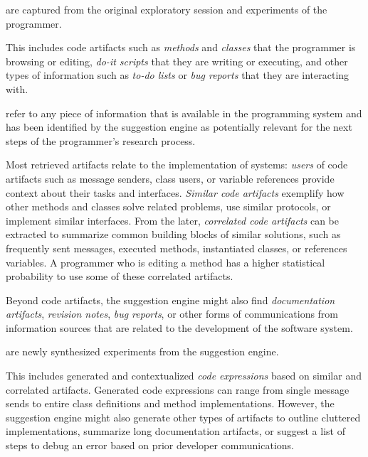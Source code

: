 \begin{description}[noextralabelsep]
	\item[Input artifacts] are captured from the original exploratory session and experiments of the programmer.

	This includes code artifacts such as \emph{methods} and \emph{classes} that the programmer is browsing or editing, \emph{do-it scripts} that they are writing or executing, and other types of information such as \emph{to-do lists} or \emph{bug reports} that they are interacting with.

	\item[Retrieved artifacts] refer to any piece of information that is available in the programming system and has been identified by the suggestion engine as potentially relevant for the next steps of the programmer's research process.

	Most retrieved artifacts relate to the implementation of systems: \emph{users} of code artifacts such as message senders, class users, or variable references provide context about their tasks and interfaces.
	\emph{Similar code artifacts} exemplify how other methods and classes solve related problems, use similar protocols, or implement similar interfaces.
	From the later, \emph{correlated code artifacts} can be extracted to summarize common building blocks of similar solutions, such as frequently sent messages, executed methods, instantiated classes, or references variables.
	A programmer who is editing a method has a higher statistical probability to use some of these correlated artifacts.

	Beyond code artifacts, the suggestion engine might also find \emph{documentation artifacts}, \emph{revision notes}, \emph{bug reports}, or other forms of communications from information sources that are related to the development of the software system.

	\item[Generated artifacts] are newly synthesized experiments from the suggestion engine.

	This includes generated and contextualized \emph{code expressions} based on similar and correlated artifacts.
	Generated code expressions can range from single message sends to entire class definitions and method implementations.
	However, the suggestion engine might also generate other types of artifacts to outline cluttered implementations, summarize long documentation artifacts, or suggest a list of steps to debug an error based on prior developer communications.
\end{description}

